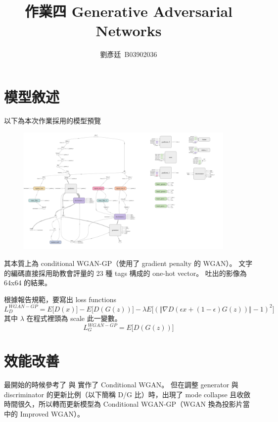 \documentclass[final,3p]{elsarticle}
\begin{document}
\begin{frontmatter}

\title{作業四 Generative Adversarial Networks}

\author{劉彥廷~B03902036}

\end{frontmatter}


\section{模型敘述}
	以下為本次作業採用的模型預覽
	\begin{figure}[H]
		\centering
		\includegraphics[width=0.95\textwidth]{images/model}
		\label{fig:model}
	\end{figure}
	其本質上為 conditional WGAN-GP（使用了 gradient penalty 的 WGAN）。
	文字的編碼直接採用助教會評量的 23 種 tags 構成的 one-hot vector。
	吐出的影像為 64x64 的結果。
	
	根據報告規範，要寫出 loss functions
	\begin{equation*}
		L^{WGAN-GP}_{D} = E \lbrack D(x) \rbrack - E \lbrack D(G(z)) \rbrack - \lambda E \lbrack ( \Vert \nabla D(\epsilon x + (1-\epsilon) G(z) )\Vert -1)^2 \rbrack
	\end{equation*}
	其中 $\lambda$ 在程式裡頭為 scale 此一變數。
	\begin{equation*}
		L^{WGAN-GP}_{G} = E \lbrack D(G(z)) \rbrack
	\end{equation*}
	
\section{效能改善}
	最開始的時候參考了 \cite{jiamings91:online} 與 \cite{zhangqia0:online} 實作了 Conditional WGAN。
	但在調整 generator 與 discriminator 的更新比例（以下簡稱 D/G 比）時，出現了 mode collapse 且收斂時間很久，所以轉而更新模型為 Conditional WGAN-GP（WGAN 換為投影片當中的 Improved WGAN）。
	
\end{document}
